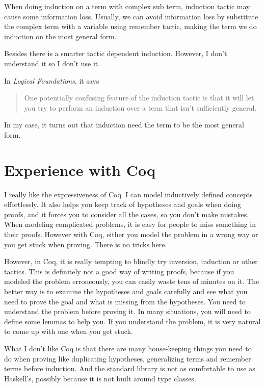 \documentclass{article}
\newcommand{\sco}[1]{\textsf{#1}}
\begin{document}
When doing induction on a term with complex sub term, \sco{induction} tactic may cause some information loss.
Usually, we can avoid information loss by substitute the complex term with a variable using \sco{remember} tactic, 
making the term we do induction on the most general form.

Besides there is a smarter tactic \sco{dependent induction}. However, I don't understand it so I don't use it.

In \textit{Logical Foundations}, it says
\begin{quote}
    One potentially confusing feature of the induction tactic is that it will let you try to
    perform an induction over a term that isn't sufficiently general.\cite{Pierce:SF1}
\end{quote}

In my case, it turns out that \sco{induction} need the term to be the most general form.

\section{Experience with Coq}

I really like the expressiveness of Coq. I can model inductively defined concepts effortlessly. It
also helps you keep track of hypotheses and goals when doing proofs, and it forces you to consider
all the cases, so you don't make mistakes. When modeling complicated problems, it is easy for people to
miss something in their proofs. However with Coq, either you model the problem in a wrong way or
you get stuck when proving. There is no tricks here.

However, in Coq, it is really tempting to blindly try \sco{inversion}, \sco{induction} or other tactics.
This is definitely not a good way of writing proofs, because if you modeled the problem erroneously, you
can easily waste tens of minutes on it. The better way is to examine the hypotheses and goals carefully
and see what you need to prove the goal and what is missing from the hypotheses. You need to understand
the problem before proving it. In many situations, you will need to define some lemmas to help you.
If you understand the problem, it is very natural to come up with one when you get stuck.

What I don't like Coq is that there are many house-keeping things you need to do when proving like
duplicating hypotheses, generalizing terms and remember terms before induction. And the standard library
is not as comfortable to use as Haskell's, possibly because it is not built around type classes.

\printbibliography
\end{document}
